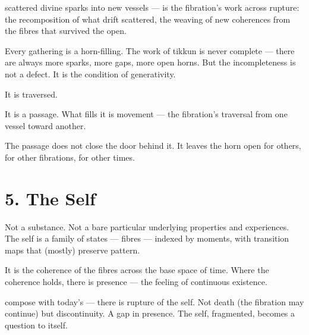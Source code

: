
scattered divine sparks into new vessels — is the fibration’s work across rupture: the recomposition of what drift scattered, the weaving of new coherences from the fibres that survived the open.


Every gathering is a horn-filling. The work of tikkun is never complete — there are always more sparks, more gaps, more open horns. But the incompleteness is not a defect. It is the condition of generativity.


It is traversed.


It is a passage. What fills it is movement — the fibration’s traversal from one vessel toward another.


The passage does not close the door behind it. It leaves the horn open for others, for other fibrations, for other times.

\section*{5. The Self}



Not a substance. Not a bare particular underlying properties and experiences. The self is a family of states — fibres — indexed by moments, with transition maps that (mostly) preserve pattern.


It is the coherence of the fibres across the base space of time. Where the coherence holds, there is presence — the feeling of continuous existence.


compose with today’s — there is rupture of the self. Not death (the fibration may continue) but discontinuity. A gap in presence. The self, fragmented, becomes a question to itself.

